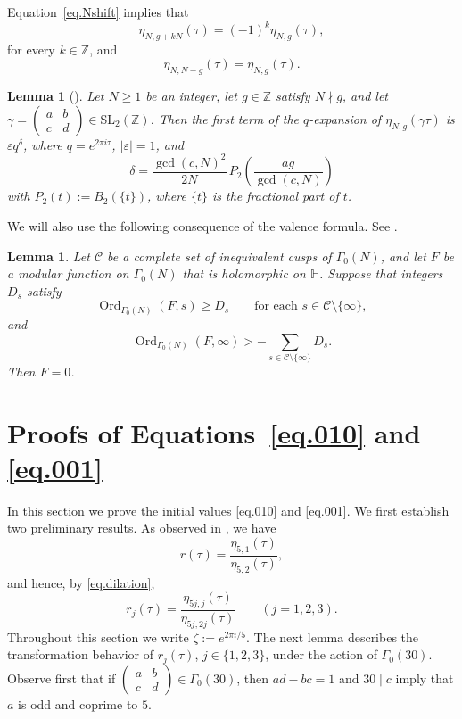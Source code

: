 \documentclass{amsart}
\newtheorem{lemma}[theorem]{Lemma}
\theoremstyle{definition}
\newcommand{\smat}[4]{\left(\begin{smallmatrix}#1&#2\\#3&#4\end{smallmatrix}\right)}
\DeclareMathOperator{\Ord}{Ord}
\begin{document}
{{Equation~\eqref{eq.Nshift} implies that
\begin{equation}
\eta_{N,g+kN}(\tau)=(-1)^k\eta_{N,g}(\tau),
\label{eq.indexshift}
\end{equation}
for every
$k\in\mathbb{Z}$, and
\begin{equation}
\eta_{N,N-g}(\tau)=\eta_{N,g}(\tau).
\label{eq.reflect}
\end{equation}

\begin{lemma}[{\cite[Lemma~2]{Yang2004}}]\label{lem.yangorder}
Let $N\ge1$ be an integer, let $g\in\mathbb{Z}$ satisfy $N\nmid g$, and let
$\gamma=\smat abcd\in\mathrm{SL}_{2}(\mathbb{Z})$.  Then the first term of
the $q$-expansion of $\eta_{N,g}(\gamma\tau)$ is $\varepsilon q^{\delta}$,
where $q=e^{2\pi i\tau}$, $|\varepsilon|=1$, and
\begin{equation*}
\delta=\frac{\gcd(c,N)^{2}}{2N}\,
P_{2}\!\left(\frac{ag}{\gcd(c,N)}\right)
\end{equation*}
with $P_{2}(t):=B_{2}(\{t\})$, where $\{t\}$ is the fractional part of $t$.
\end{lemma}

We will also use the following consequence of the valence formula. See
\cite[Theorem~4.1.4]{Rankin1977}.
\begin{lemma}\label{lem.valence}
Let $\mathcal{C}$ be a complete set of inequivalent cusps of
$\Gamma_{0}(N)$, and let $F$ be a modular function on $\Gamma_{0}(N)$
that is holomorphic on $\mathbb{H}$. Suppose that integers $D_{s}$
satisfy
\begin{equation*}
\Ord_{\Gamma_{0}(N)}(F,s)\ge D_{s}
\qquad\text{for each }s\in\mathcal{C}\setminus\{\infty\},
\end{equation*}
and
\begin{equation*}
\Ord_{\Gamma_{0}(N)}(F,\infty)>
-\sum_{s\in\mathcal{C}\setminus\{\infty\}}D_{s}.
\end{equation*}
Then $F=0$.
\end{lemma}

\section{Proofs of Equations~\eqref{eq.010} and \eqref{eq.001}}\label{sec.init}
In this section we prove the initial values \eqref{eq.010} and
\eqref{eq.001}.  We first establish two preliminary results. As observed in \cite[p.~56]{Gua_RR}, we have
\begin{equation*}
r(\tau)=\frac{\eta_{5,1}(\tau)}{\eta_{5,2}(\tau)},
\end{equation*}
and hence, by \eqref{eq.dilation},
\begin{equation}\label{eq.rgeneta}
r_{j}(\tau)=\frac{\eta_{5j,j}(\tau)}{\eta_{5j,2j}(\tau)}
\qquad(j=1,2,3).
\end{equation}
Throughout this section we write $\zeta:=e^{2\pi i/5}$. The next lemma describes the transformation behavior of $r_{j}(\tau)$, $j\in\{1,2,3\}$, under the action of $\Gamma_{0}(30)$. Observe first that if
$\smat abcd\in\Gamma_{0}(30)$, then $ad-bc=1$ and $30\mid c$ imply that $a$ is
odd and coprime to $5$.


}}
\end{document}
